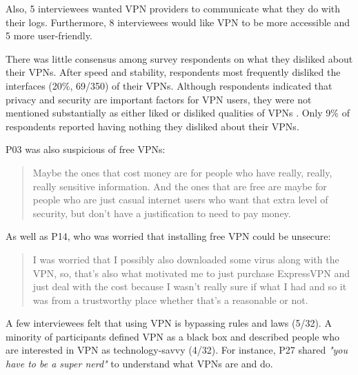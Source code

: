 Also, 5 interviewees wanted VPN providers to communicate what they do with
their logs. Furthermore, 8 interviewees would like VPN to be more accessible
and 5 more user-friendly. 

There was little consensus among survey respondents on what they disliked about their VPNs.
After speed and stability, respondents most frequently disliked the interfaces
(20\%, 69/350) of their VPNs. Although respondents indicated that privacy and
security are important factors for VPN users, they were not mentioned
substantially as either liked or disliked qualities of VPNs . Only 9\% of respondents reported
having nothing they disliked about their VPNs.

P03 was also suspicious of free VPNs: \begin{quote}Maybe the ones that cost money are for people who have
really, really, really sensitive information. And the ones that are free are
maybe for people who are just casual internet users who want that extra level
of security, but don't have a justification to need to pay money. \end{quote}

As well as P14, who was worried that installing free VPN could be unsecure:
\begin{quote}I was worried that I possibly also downloaded some virus along
with the VPN, so, that's also what motivated me to just purchase ExpressVPN and
just deal with the cost because I wasn't really sure if what I had and so it
was from a trustworthy place whether that's a reasonable or not.\end{quote}

A few interviewees felt that using VPN is
bypassing rules and laws (5/32). A minority of participants defined VPN as a black box and described people who are
interested in VPN as technology-savvy (4/32). For instance, P27 shared \textit{"you have to be a super nerd"} to understand what VPNs are and do.